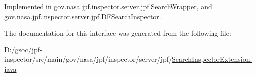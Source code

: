 Implemented in \hyperlink{classgov_1_1nasa_1_1jpf_1_1inspector_1_1server_1_1jpf_1_1_search_wrapper_a2368d7c9f74aa0574e64e0fd3e7a4bf1}{gov.\+nasa.\+jpf.\+inspector.\+server.\+jpf.\+Search\+Wrapper}, and \hyperlink{classgov_1_1nasa_1_1jpf_1_1inspector_1_1server_1_1jpf_1_1_d_f_search_inspector_a38333f3c6158ad2b2b6dbc8688b2d6bb}{gov.\+nasa.\+jpf.\+inspector.\+server.\+jpf.\+D\+F\+Search\+Inspector}.



The documentation for this interface was generated from the following file\+:\begin{DoxyCompactItemize}
\item 
D\+:/gsoc/jpf-\/inspector/src/main/gov/nasa/jpf/inspector/server/jpf/\hyperlink{_search_inspector_extension_8java}{Search\+Inspector\+Extension.\+java}\end{DoxyCompactItemize}
